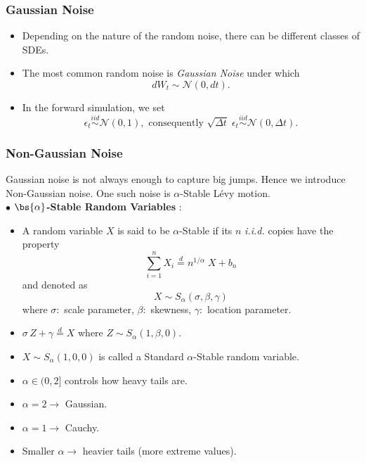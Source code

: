 \subsubsection{Gaussian Noise}

\begin{itemize}
\item Depending on the nature of the random noise, there can be different classes of SDEs. 

\item The most common random noise is \textit{Gaussian Noise} under which $$dW_t \sim \mathcal{N}(0, dt).$$

\item In the forward simulation, we set $$\epsilon_t \overset{iid}{\sim} \mathcal{N}(0, 1), \text{ consequently } \sqrt{\Delta t} \; \epsilon_t \overset{iid}{\sim} \mathcal{N}(0, \Delta t).$$
\end{itemize}

\subsubsection{Non-Gaussian Noise}

Gaussian noise is not always enough to capture big jumps. Hence we introduce Non-Gaussian noise. One such noise is $\alpha$-Stable Lévy motion.\\[1em]

$\bullet$ \textbf{$\bs{\alpha}$-Stable Random Variables} : 

\begin{itemize}

\item A random variable $X$ is said to be $\alpha$-Stable if its $n$ \textit{i.i.d.} copies have the property $$\sum \limits_{i = 1}^{n} X_i \overset{d}{=} n^{1/\alpha} \; X + b_n$$ and denoted as $$X \sim S_{\alpha} (\sigma, \beta, \gamma)$$ where $\sigma :$ scale parameter, $\beta :$ skewness, $\gamma :$ location parameter.

\item $\sigma \, Z + \gamma \overset{d}{=} X$ where $Z \sim S_{\alpha}(1, \beta, 0)$.

\item $X \sim S_{\alpha}(1, 0, 0)$ is called a Standard $\alpha$-Stable random variable.

\item $\alpha \in (0, 2]$ controls how heavy tails are.

\item $\alpha = 2 \rightarrow$ Gaussian.

\item $\alpha = 1 \rightarrow$ Cauchy.

\item Smaller $\alpha \rightarrow$ heavier tails (more extreme values).
\end{itemize}


